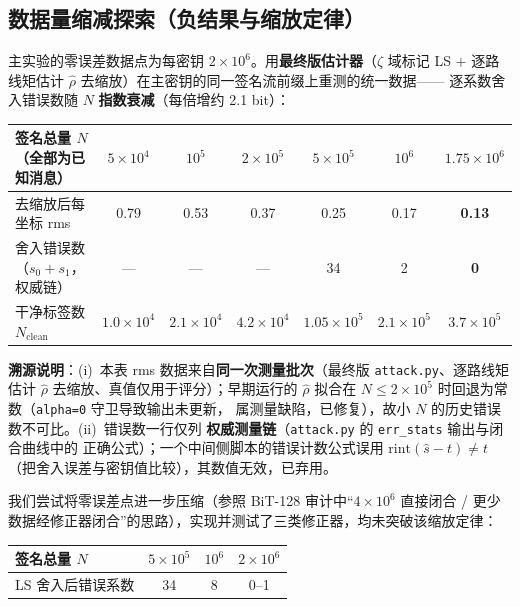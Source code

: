 \documentclass[UTF8,11pt,a4paper]{ctexart}
\newcommand{\code}[1]{\texttt{\small #1}}
\begin{document}
\subsection{数据量缩减探索（负结果与缩放定律）}

主实验的零误差数据点为每密钥 $2\times10^6$。用\textbf{最终版估计器}（$\zeta$ 域标记
LS $+$ 逐路线矩估计 $\hat\rho$ 去缩放）在主密钥的同一签名流前缀上重测的统一数据——
逐系数舍入错误数随 $N$ \textbf{指数衰减}（每倍增约 2.1 bit）：

\begin{center}\small
\begin{tabular}{@{}lcccccc@{}}
\toprule
签名总量 $N$（全部为已知消息） & $5\times10^4$ & $10^5$ & $2\times10^5$ & $5\times10^5$ & $10^6$ & $1.75\times10^6$ \\
\midrule
去缩放后每坐标 rms & 0.79 & 0.53 & 0.37 & 0.25 & 0.17 & \textbf{0.13} \\
舍入错误数（$s_0{+}s_1$，权威链） & --- & --- & --- & 34 & 2 & \textbf{0} \\
干净标签数 $N_{\mathrm{clean}}$ & $1.0\times10^4$ & $2.1\times10^4$ & $4.2\times10^4$ & $1.05\times10^5$ & $2.1\times10^5$ & $3.7\times10^5$ \\
\bottomrule
\end{tabular}
\end{center}

\noindent\textbf{溯源说明}：(i)~本表 rms 数据来自\textbf{同一次测量批次}（最终版
\code{attack.py}、逐路线矩估计 $\hat\rho$ 去缩放、真值仅用于评分）；早期运行的
$\hat\rho$ 拟合在 $N\le2\times10^5$ 时回退为常数（\code{alpha=0} 守卫导致输出未更新，
属测量缺陷，已修复），故小 $N$ 的历史错误数不可比。(ii)~错误数一行仅列
\textbf{权威测量链}（\code{attack.py} 的 \code{err\_stats} 输出与闭合曲线中的
正确公式）；一个中间侧脚本的错误计数公式误用 $\mathrm{rint}(\hat s-t)\neq t$
（把舍入误差与密钥值比较），其数值无效，已弃用。

我们尝试将零误差点进一步压缩（参照 BiT-128 审计中``$4\times10^6$ 直接闭合 /
更少数据经修正器闭合''的思路），实现并测试了三类修正器，均未突破该缩放定律：

\begin{center}\small
\begin{tabular}{@{}lccc@{}}
\toprule
签名总量 $N$ & $5\times10^5$ & $10^6$ & $2\times10^6$ \\
\midrule
LS 舍入后错误系数 & 34 & 8 & 0--1 \\
\bottomrule
\end{tabular}
\end{center}
\end{document}
